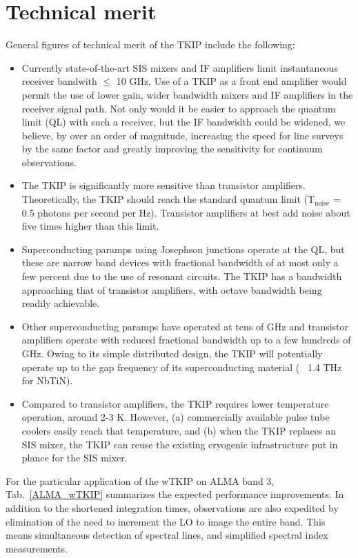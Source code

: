 \section*{Technical merit}
General figures of technical merit of the TKIP include the following:

\begin{itemize}
\item Currently state-of-the-art  SIS mixers and IF amplifiers limit instantaneous receiver bandwith $\le$ 10 GHz. Use of a TKIP as a front end amplifier would permit the use of lower gain, wider bandwidth mixers and IF amplifiers in the receiver signal path.  Not only would it be easier to approach the quantum limit (QL) with such a receiver, but the IF bandwidth could be widened, we believe, by over an order of magnitude, increasing the speed for line surveys by the same factor and greatly improving the sensitivity for continuum observations.

\item The TKIP is significantly more sensitive than transistor amplifiers. Theoretically, the TKIP should reach the standard quantum limit (T$_\text{noise}$ = 0.5 photons per second per Hz). Transistor amplifiers at best add noise about five times higher than this limit.

\item Superconducting paramps using Josephson junctions operate at the QL, but these are narrow band devices with fractional bandwidth of at most only a few percent due to the use of resonant circuits. The TKIP has a bandwidth approaching that of transistor amplifiers, with octave bandwidth being readily achievable.

\item Other superconducting paramps have operated at tens of GHz and transistor amplifiers operate with reduced fractional bandwidth up to a few hundreds of GHz. Owing to its simple distributed design, the TKIP will potentially operate up to the gap frequency of its superconducting material (~ 1.4 THz for NbTiN).

\item Compared to transistor amplifiers, the TKIP requires lower temperature operation, around 2-3 K. However,  (a) commercially available pulse tube coolers easily reach that temperature, and (b) when the TKIP replaces an SIS mixer, the TKIP can reuse the existing  cryogenic infrastructure put in plance for the SIS mixer.
\end{itemize}

For the particular application of the wTKIP on ALMA band 3,  Tab.~\ref{ALMA_wTKIP} summarizes the expected performance improvements. In addition to the shortened integration times, observations are also expedited by elimination of the need to increment the LO to image the entire band. This means simultaneous detection of spectral lines, and simplified spectral index measurements.




